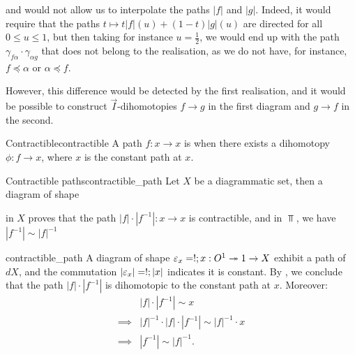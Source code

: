 and would not allow us to interpolate the paths \( |f| \) and \( |g| \). Indeed, it would require that the paths \( t \mapsto t|f|(u) + (1-t)|g|(u) \) are directed for all \( 0 \le u \le 1 \), but then taking for instance \( u=\frac12 \), we would end up with the path \( \gamma_{f\alpha}\cdot\gamma_{\alpha g} \) that does not belong to the realisation, as we do not have, for instance, \( f \preceq \alpha \) or \( \alpha \preceq f \). 

However, this difference would be detected by the first realisation, and it would be possible to construct \( \vec I \)-dihomotopies \( f \to g \) in the first diagram and \( g \to f \) in the second.


\begin{cdef}{Contractible}{contractible}
    A path \( f : x \to x \) is  when there exists a dihomotopy \( \phi : f \to x \), where \( x \) is the constant path at \( x \). 
\end{cdef}

\begin{cprop}{Contractible paths}{contractible_path}
    Let \( X \) be a diagrammatic set, then a diagram of shape 
    \begin{center}
    \end{center} 
    in \( X \) proves that the path \( |f|\cdot|f^{-1}| : x \to x \) is contractible, and in \( \Top \), we have \( |f^{-1}| \sim |f|^{-1} \)
\end{cprop}
\begin{propproof}{contractible_path}
    A diagram of shape \( \varepsilon_x = !;x : O^1 \twoheadrightarrow 1 \to X \) exhibit a path of \( dX \), and the commutation \( |\varepsilon_x| = !;|x| \) indicates it is constant. By , we conclude that the path \( |f|\cdot|f^{-1}| \) is dihomotopic to the constant path at \( x \). Moreover:
    \begin{align*}
        &|f|\cdot|f^{-1}| \sim x \\
        \implies& |f|^{-1}\cdot|f|\cdot|f^{-1}| \sim |f|^{-1}\cdot x \\
        \implies& |f^{-1}| \sim |f|^{-1}.
    \end{align*}
\end{propproof}

